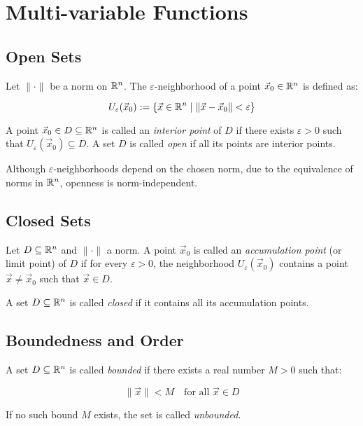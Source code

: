 \newpage
\section{Multi-variable Functions}

\subsection{Open Sets}

Let \( \| \cdot \| \) be a norm on \( \mathbb{R}^n \). The \( \varepsilon \)-neighborhood of a 
point \( \vec{x}_0 \in \mathbb{R}^n \) is defined as:

\[
    U_\varepsilon(\vec{x}_0) := \left\{ \vec{x} \in \mathbb{R}^n \mid \| \vec{x} - \vec{x}_0 \| 
    < \varepsilon \right\}
\]

A point \( \vec{x}_0 \in D \subseteq \mathbb{R}^n \) is called an \emph{interior point} of \( D \) 
if there exists \( \varepsilon > 0 \) such that \( U_\varepsilon(\vec{x}_0) \subseteq D \).  
A set \( D \) is called \emph{open} if all its points are interior points.

Although \( \varepsilon \)-neighborhoods depend on the chosen norm, due to the equivalence of norms 
in \( \mathbb{R}^n \), openness is norm-independent.

\subsection{Closed Sets}

Let \( D \subseteq \mathbb{R}^n \) and \( \| \cdot \| \) a norm. A point \( \vec{x}_0 \) is called 
an \emph{accumulation point} (or limit point) of \( D \) if for every \( \varepsilon > 0 \), the 
neighborhood \( U_\varepsilon(\vec{x}_0) \) contains a point \( \vec{x} \ne \vec{x}_0 \) such that 
\( \vec{x} \in D \).

A set \( D \subseteq \mathbb{R}^n \) is called \emph{closed} if it contains all its accumulation points.

\subsection{Boundedness and Order}

A set \( D \subseteq \mathbb{R}^n \) is called \emph{bounded} if there exists a real number \( M > 0 \) 
such that:

\[
    \|\vec{x}\| < M \quad \text{for all } \vec{x} \in D
\]

If no such bound \( M \) exists, the set is called \emph{unbounded}.

